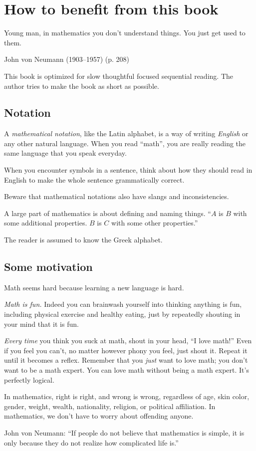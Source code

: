\chapter{How to benefit from this book}

\epigraph{Young man, in mathematics you don't understand things. You just get used to them.}{John von Neumann (1903--1957) \cite{zukav1979dancing} (p. 208)}

This book is optimized for slow thoughtful focused sequential reading.
The author tries to make the book as short as possible.

\section{Notation}

A \emph{mathematical notation}, like the Latin alphabet,
is a way of writing \emph{English} or any other natural language.
When you read ``math'',
you are really reading the same language
that you speak everyday.

When you encounter symbols in a sentence,
think about how they should read in English
to make the whole sentence grammatically correct.

Beware that mathematical notations also have slangs and inconsistencies.

A large part of mathematics is about defining and naming things.
``\(A\) is \(B\) with some additional properties. \(B\) is \(C\) with some other properties.''

The reader is assumed to know the Greek alphabet.

\section{Some motivation}

Math seems hard because learning a new language is hard.

\emph{Math is fun.}
Indeed you can brainwash yourself into thinking anything is fun,
including physical exercise and healthy eating,
just by repeatedly shouting in your mind that it is fun.

\emph{Every time} you think you suck at math,
shout in your head, ``I love math!''
Even if you feel you can't,
no matter however phony you feel,
just shout it.
Repeat it until it becomes a reflex.
Remember that you \emph{just} want to love math;
you don't want to be a math expert.
You can love math without being a math expert.
It's perfectly logical.

In mathematics, right is right, and wrong is wrong,
regardless of age, skin color, gender, weight, wealth,
nationality, religion, or political affiliation.
In mathematics, we don't have to worry about offending anyone.

John von Neumann:
``If people do not believe that mathematics is simple, it is only because they do not realize how complicated life is.''
